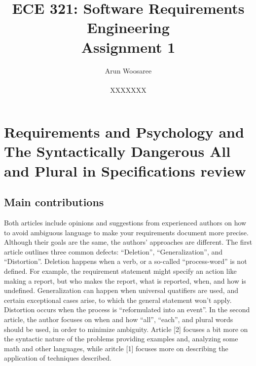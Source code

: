 \documentclass[letterpaper,12pt]{article}
\title{ECE 321: Software Requirements Engineering \\ Assignment 1}
\author{Arun Woosaree \\ \\ XXXXXXX}
\begin{document}
\maketitle

\section{Requirements and Psychology
  and
  The Syntactically Dangerous All and Plural in Specifications
  review}

\subsection{Main contributions}
Both articles include opinions and suggestions from experienced authors on how
to avoid ambiguous language to make your requirements document more precise.
Although their goals are the same, the authors' approaches are different. The
first article outlines three common defects: ``Deletion'', ``Generalization'',
and ``Distortion''. Deletion happens when a verb, or a so-called
``process-word'' is not defined. For example, the requirement statement might
specify an action like making a report, but who makes the report, what is
reported, when, and how is undefined. Generalization can happen when universal
quatifiers are used, and certain exceptional cases arise, to which the general
statement won't apply. Distortion occurs when the process is ``reformulated into
an event''. In the second article, the author focuses on when and how ``all'',
``each'', and plural words should be used, in order to minimize ambiguity.
Article [2] focuses a bit more on the syntactic nature of the problems providing
examples and, analyzing some math and other languages, while aritcle [1] focuses
more on describing the application of techniques described.
\end{document}
